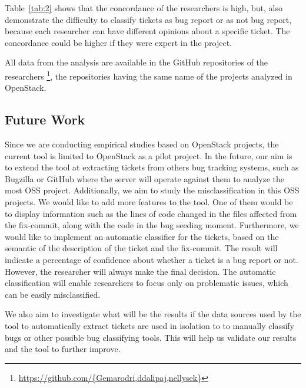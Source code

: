 \documentclass[runningheads,a4paper]{llncs}
\begin{document}
Table~\ref{tab:2} shows that the concordance of the researchers is high, but, also demonstrate the difficulty to classify tickets as bug report or as not bug report, because each researcher can have different opinions about a specific ticket. The concordance could be higher if they were expert in the project.
 
All data from the analysis are available in the GitHub repositories of the researchers \footnote{\url{https://github.com/{Gemarodri,ddalipaj,nellysek}}}, the repositories having the same name of the projects analyzed in OpenStack.

\subsection{Future Work}
\label{sec:5.1}

Since we are conducting empirical studies based on OpenStack projects, the current tool is limited to OpenStack as a pilot project. In the future, our aim is to extend the tool at extracting tickets from others bug tracking systems, such as Bugzilla or GitHub where the server will operate against them to analyze the most OSS project. Additionally, we aim to study the misclassification in this OSS projects. We would like to add more features to the tool. One of them would be to display information such as the lines of code changed in the files affected from the fix-commit, along with the code in the bug seeding moment. Furthermore, we would like to implement an automatic classifier for the tickets, based on the semantic of the description of the ticket and the fix-commit. The result will indicate a percentage of confidence about whether a ticket is a bug report or not. However, the researcher will always make the final decision. The automatic classification will enable researchers to focus only on problematic issues, which can be easily misclassified. 

We also aim to investigate what will be the results if the data sources used by the tool to automatically extract tickets are used in isolation to to manually classify bugs or other possible bug classifying tools. This will help us validate our results and the tool to further improve.
\end{document}
